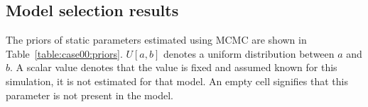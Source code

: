 \documentclass[]{elsarticle}
\begin{document}
\subsection{Model selection results}


The priors of static parameters estimated using MCMC are shown in Table~\ref{table:case00:priors}. $U[a,b]$ denotes a uniform distribution between $a$ and $b$. A scalar value denotes that the value is fixed and assumed known for this simulation, it is not estimated for that model. An empty cell signifies that this parameter is not present in the model.

\begin{table}[!h]
\caption{Prior parameter distributions.}
\label{table:case00:priors}
\end{table}
\end{document}
